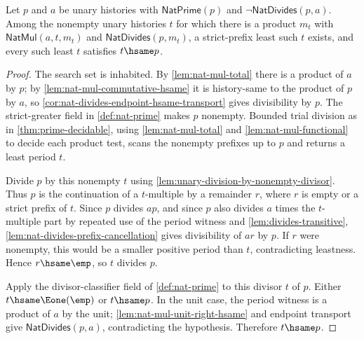 \begin{lemma}
\label{lem:prime-least-multiple-period}
Let $p$ and $a$ be unary histories with $\mathsf{NatPrime}(p)$ and $\neg\mathsf{NatDivides}(p,a)$. Among the nonempty unary histories $t$ for which there is a product $m_t$ with $\mathsf{NatMul}(a,t,m_t)$ and $\mathsf{NatDivides}(p,m_t)$, a strict-prefix least such $t$ exists, and every such least $t$ satisfies $t\hsame p$.
\end{lemma}
\begin{proof}
The search set is inhabited. By \autoref{lem:nat-mul-total} there is a product of $a$ by $p$; by \autoref{lem:nat-mul-commutative-hsame} it is history-same to the product of $p$ by $a$, so \autoref{cor:nat-divides-endpoint-hsame-transport} gives divisibility by $p$. The strict-greater field in \autoref{def:nat-prime} makes $p$ nonempty. Bounded trial division as in \autoref{thm:prime-decidable}, using \autoref{lem:nat-mul-total} and \autoref{lem:nat-mul-functional} to decide each product test, scans the nonempty prefixes up to $p$ and returns a least period $t$.

Divide $p$ by this nonempty $t$ using \autoref{lem:unary-division-by-nonempty-divisor}. Thus $p$ is the continuation of a $t$-multiple by a remainder $r$, where $r$ is empty or a strict prefix of $t$. Since $p$ divides $a p$, and since $p$ also divides $a$ times the $t$-multiple part by repeated use of the period witness and \autoref{lem:divides-transitive}, \autoref{lem:nat-divides-prefix-cancellation} gives divisibility of $a r$ by $p$. If $r$ were nonempty, this would be a smaller positive period than $t$, contradicting leastness. Hence $r\hsame\emp$, so $t$ divides $p$.

Apply the divisor-classifier field of \autoref{def:nat-prime} to this divisor $t$ of $p$. Either $t\hsame\Eone(\emp)$ or $t\hsame p$. In the unit case, the period witness is a product of $a$ by the unit; \autoref{lem:nat-mul-unit-right-hsame} and endpoint transport give $\mathsf{NatDivides}(p,a)$, contradicting the hypothesis. Therefore $t\hsame p$.
\end{proof}

